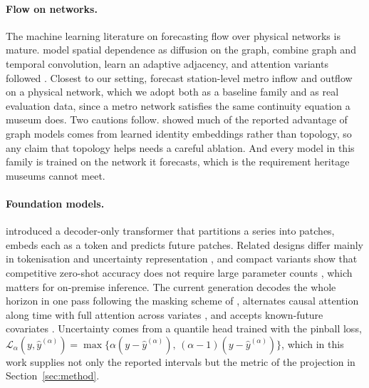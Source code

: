 \documentclass[11pt]{article}
\theoremstyle{plain}
\theoremstyle{definition}
\theoremstyle{remark}
\begin{document}
\paragraph{Flow on networks.}
The machine learning literature on forecasting flow over physical networks is mature. \citet{li2018dcrnn} model spatial dependence as diffusion on the graph, \citet{yu2018stgcn} combine graph and temporal convolution, \citet{wu2019graphwavenet} learn an adaptive adjacency, and attention variants followed \citep{guo2019astgcn,zheng2020gman}. Closest to our setting, \citet{liu2022pvcgn} forecast station-level metro inflow and outflow on a physical network, which we adopt both as a baseline family and as real evaluation data, since a metro network satisfies the same continuity equation a museum does. Two cautions follow. \citet{shao2022stid} showed much of the reported advantage of graph models comes from learned identity embeddings rather than topology, so any claim that topology helps needs a careful ablation. And every model in this family is trained on the network it forecasts, which is the requirement heritage museums cannot meet.

\paragraph{Foundation models.}
\citet{das2024timesfm} introduced a decoder-only transformer that partitions a series into patches, embeds each as a token and predicts future patches. Related designs differ mainly in tokenisation and uncertainty representation \citep{ansari2024chronos,woo2024moirai,goswami2024moment}, and compact variants show that competitive zero-shot accuracy does not require large parameter counts \citep{ekambaram2024ttm}, which matters for on-premise inference. The current generation decodes the whole horizon in one pass following the masking scheme of \citet{auer2025tirex}, alternates causal attention along time with full attention across variates \citep{khwaja2026toto2,timesfm3}, and accepts known-future covariates \citep{timesfm3,ansari2025chronos2}. Uncertainty comes from a quantile head trained with the pinball loss, $\mathcal{L}_{\alpha}(y,\hat{y}^{(\alpha)}) = \max\{\alpha(y-\hat{y}^{(\alpha)}),\,(\alpha-1)(y-\hat{y}^{(\alpha)})\}$, which in this work supplies not only the reported intervals but the metric of the projection in Section~\ref{sec:method}.
\end{document}
